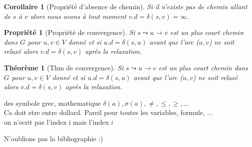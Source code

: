 \documentclass[12pt,a4paper,final]{article}
\newtheorem{prop}{Propriété}
\newtheorem{corollaire}{Corollaire}
\newtheorem{thm}{Théorème}
\begin{document}
\begin{corollaire}[Propriété d'absence de chemin]\label{no_path_prop}
Si il n'existe pas de chemin allant de $s$ à $v$ alors nous avons à tout moment $v.d = \delta(s,v) = \infty$.
\end{corollaire}

\begin{prop}[Propriété de convergence]\label{convergence_prop}
Si $s \leadsto u \rightarrow v$ est un plus court chemin dans $G$ pour $u, v \in V$ donné et si $u.d = \delta(s,u)$ avant que l'arc ($u,v$) ne soit relaxé alors $v.d = \delta(s,v)$ après la relaxation.
\end{prop}

\begin{thm}[Thm de convergence]\label{convergence_thm}
Si $s \leadsto u \rightarrow v$ est un plus court chemin dans $G$ pour $u, v \in V$ donné et si $u.d = \delta(s,u)$ avant que l'arc ($u,v$) ne soit relaxé alors $v.d = \delta(s,v)$ après la relaxation.
\end{thm}

des symbole grec, mathematique $\delta(a), \sigma(a), \neq, \leq, \geq, ...$\\
Ca doit etre entre dollard. Pareil pour toutes les variables, formule, ...\\
on n'ecrit pas l'index i mais l'index $i$

N'oublions pas la bibliographie :)



\end{document}

